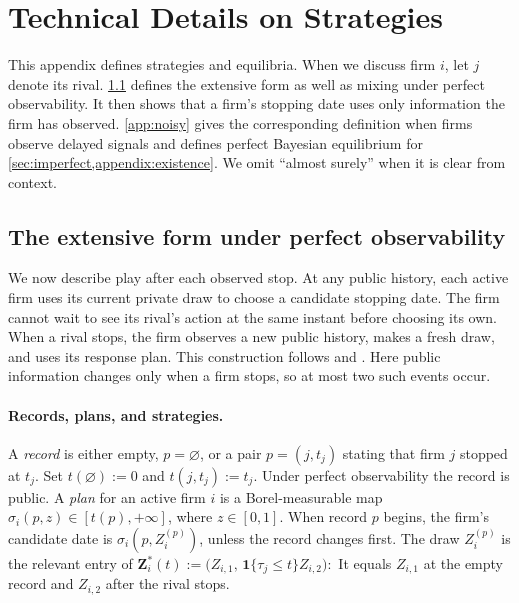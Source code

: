 \documentclass[12pt,reqno]{article}
\theoremstyle{definition} \newtheorem{example}{Example}
\theoremstyle{definition} \newtheorem{condition}{Condition}
\theoremstyle{definition} \newtheorem{corollary}{Corollary}
\theoremstyle{definition} \newtheorem{claim}{Claim}
\theoremstyle{definition} \newtheorem{definition}{Definition}
\theoremstyle{definition} \newtheorem{conjecture}{Conjecture}
\theoremstyle{definition} \newtheorem{Lemma}{Lemma}
\theoremstyle{definition} \newtheorem{lemma}{Lemma}
\theoremstyle{plain} \newtheorem{theorem}{Theorem}
\theoremstyle{definition} \newtheorem{assumption}{Assumption}
\theoremstyle{definition} \newtheorem*{assumptionnonumber}{Assumption}
\theoremstyle{definition} \newtheorem*{theoremNoNumber}{Proposition}
\theoremstyle{definition}
\theoremstyle{definition}\newtheorem{proposition}{Proposition}
\theoremstyle{definition} \newtheorem{result}{Result}
\theoremstyle{definition} \newtheorem*{definitionNoNumber}{Definition}
\theoremstyle{definition} \newtheorem{Definition}{Definition}
\theoremstyle{definition} \newtheorem*{DefinitionNoNumber}{Definition}
\theoremstyle{definition} \newtheorem*{fact}{Fact}
\theoremstyle{definition} \newtheorem*{property}{Property}
\theoremstyle{definition} \newtheorem{remark}{Remark}
\begin{document}
\section{Technical Details on Strategies} \label{appendix:technical}
This appendix defines strategies and equilibria. When we discuss firm $i$, let $j$ denote its rival. \cref{app:extform} defines the extensive form as well as mixing under perfect observability. It then shows that a firm's stopping date uses only information the firm has observed. \cref{app:noisy} gives the corresponding definition when firms observe delayed signals and defines perfect Bayesian equilibrium for \cref{sec:imperfect,appendix:existence}. We omit ``almost surely'' when it is clear from context.


\subsection{The extensive form under perfect observability}\label{app:extform}

We now describe play after each observed stop. At any public history, each active firm uses its current private draw to choose a candidate stopping date. The firm cannot wait to see its rival's action at the same instant before choosing its own. When a rival stops, the firm observes a new public history, makes a fresh draw, and uses its response plan. This construction follows \citet{riedel2017subgame} and \citet{laraki2005continuous}. Here public information changes only when a firm stops, so at most two such events occur.

\paragraph{Records, plans, and strategies.}
A \emph{record} is either empty, $p=\varnothing$, or a pair $p=(j,t_j)$ stating that firm $j$ stopped at $t_j$. Set $t(\varnothing):=0$ and $t(j,t_j):=t_j$. Under perfect observability the record is public. A \emph{plan} for an active firm $i$ is a Borel-measurable map $\sigma_i(p,z)\in[t(p),+\infty]$, where $z\in[0,1]$. When record $p$ begins, the firm's candidate date is $\sigma_i(p,Z_i^{(p)})$, unless the record changes first. The draw $Z_i^{(p)}$ is the relevant entry of
$
\bm Z_i^\ast(t):=\bigl(Z_{i,1},\,\mathbf 1\{\tau_j\le t\}Z_{i,2}\bigr):$
It equals $Z_{i,1}$ at the empty record and $Z_{i,2}$ after the rival stops. 
\end{document}
